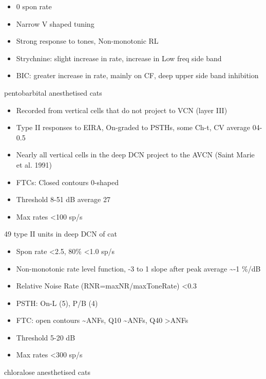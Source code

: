 \documentclass[10pt,a4paper]{article}
\begin{document}
\begin{itemize}
\item 0 spon rate
\item Narrow V shaped tuning
\item Strong response to tones, Non-monotonic RL
\item Strychnine: slight increase in rate, increase in Low freq side band
\item BIC: greater increase in rate, mainly on CF, deep upper side band
  inhibition
\end{itemize}
\citep{Rhode:1999} pentobarbital anesthetised cats


\begin{itemize}
\item Recorded from vertical cells that do not project to VCN (layer III)
\item Type II responses to EIRA, On-graded to PSTHs, some Ch-t, CV average
  04-0.5
\item Nearly all vertical cells in the deep DCN project to the AVCN (Saint Marie
  et al. 1991)
\item FTCs: Closed contours 0-shaped
\item Threshold 8-51 dB average 27
\item Max rates {\textless}100 sp/s
\end{itemize}
\citep{YoungVoigt:1982} 49 type II units in deep DCN of cat


\begin{itemize}
\item Spon rate {\textless}2.5, 80\% {\textless}1.0 sp/s
\item Non-monotonic rate level function, -3 to 1 slope after peak average \~{}-1
  \%/dB
\item Relative Noise Rate (RNR=maxNR/maxToneRate) {\textless}0.3
\item PSTH: On-L (5), P/B (4)
\item FTC: open contours \~{}ANFs, Q10 \~{}ANFs, Q40 {\textgreater}ANFs
\item Threshold 5-20 dB
\item Max rates {\textless}300 sp/s
\end{itemize}
\citep{JorisSmith:1998} chloralose anesthetised cats
\end{document}
